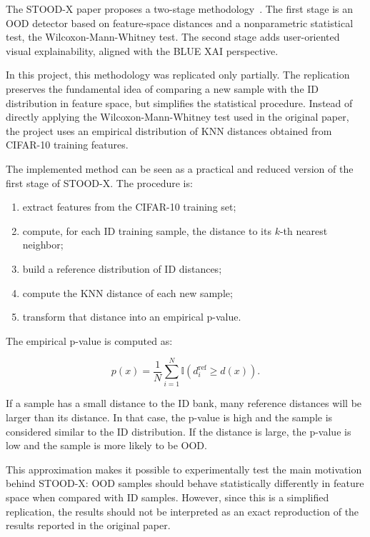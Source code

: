 \documentclass[11pt,a4paper]{article}
\begin{document}
The STOOD-X paper proposes a two-stage methodology~\cite{stoodx2025}.
The first stage is an OOD detector based on feature-space distances and a nonparametric statistical test, the Wilcoxon-Mann-Whitney test.
The second stage adds user-oriented visual explainability, aligned with the BLUE XAI perspective.

In this project, this methodology was replicated only partially.
The replication preserves the fundamental idea of comparing a new sample with the ID distribution in feature space, but simplifies the statistical procedure.
Instead of directly applying the Wilcoxon-Mann-Whitney test used in the original paper, the project uses an empirical distribution of KNN distances obtained from CIFAR-10 training features.

The implemented method can be seen as a practical and reduced version of the first stage of STOOD-X.
The procedure is:

\begin{enumerate}
    \item extract features from the CIFAR-10 training set;
    \item compute, for each ID training sample, the distance to its $k$-th nearest neighbor;
    \item build a reference distribution of ID distances;
    \item compute the KNN distance of each new sample;
    \item transform that distance into an empirical p-value.
\end{enumerate}

The empirical p-value is computed as:

\begin{equation}
    p(x) = \frac{1}{N}\sum_{i=1}^{N}\mathbb{I}(d_i^{\text{ref}} \geq d(x)).
\end{equation}

If a sample has a small distance to the ID bank, many reference distances will be larger than its distance.
In that case, the p-value is high and the sample is considered similar to the ID distribution.
If the distance is large, the p-value is low and the sample is more likely to be OOD.

This approximation makes it possible to experimentally test the main motivation behind STOOD-X: OOD samples should behave statistically differently in feature space when compared with ID samples.
However, since this is a simplified replication, the results should not be interpreted as an exact reproduction of the results reported in the original paper.
\end{document}
